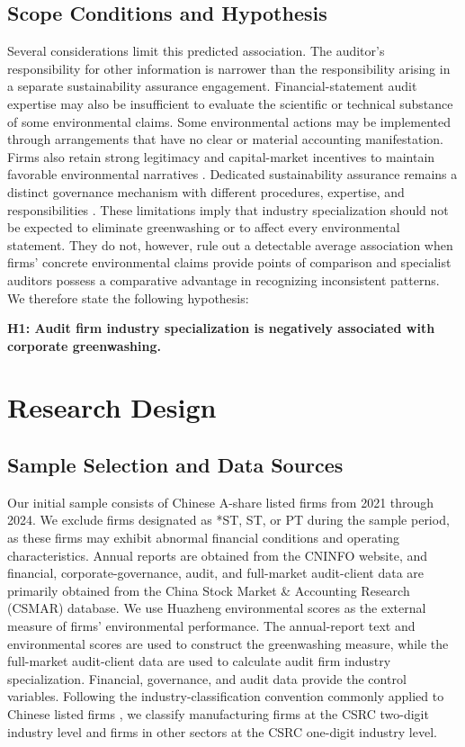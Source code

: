 \documentclass[11pt]{article}
\begin{document}
\subsection{Scope Conditions and Hypothesis}

Several considerations limit this predicted association.
The auditor's responsibility for other information is narrower than the responsibility arising in a separate sustainability assurance engagement.
Financial-statement audit expertise may also be insufficient to evaluate the scientific or technical substance of some environmental claims.
Some environmental actions may be implemented through arrangements that have no clear or material accounting manifestation.
Firms also retain strong legitimacy and capital-market incentives to maintain favorable environmental narratives \citep{delmas2011drivers,healy2001information,verrecchia2001essays}.
Dedicated sustainability assurance remains a distinct governance mechanism with different procedures, expertise, and responsibilities \citep{simnett2009assurance,pflugrath2011impact,cohen2015csr}.
These limitations imply that industry specialization should not be expected to eliminate greenwashing or to affect every environmental statement.
They do not, however, rule out a detectable average association when firms' concrete environmental claims provide points of comparison and specialist auditors possess a comparative advantage in recognizing inconsistent patterns.
We therefore state the following hypothesis:

\medskip
\noindent\textbf{H1: Audit firm industry specialization is negatively associated with corporate greenwashing.}
\medskip

\section{Research Design}

\subsection{Sample Selection and Data Sources}

Our initial sample consists of Chinese A-share listed firms from 2021 through 2024. 
We exclude firms designated as *ST, ST, or PT during the sample period, as these firms may exhibit abnormal financial conditions and operating characteristics.
Annual reports are obtained from the CNINFO website, and financial, corporate-governance, audit, 
and full-market audit-client data are primarily obtained from the China Stock Market \& Accounting Research (CSMAR) database. 
We use Huazheng environmental scores as the external measure of firms' environmental performance. 
The annual-report text and environmental scores are used to construct the greenwashing measure, 
while the full-market audit-client data are used to calculate audit firm industry specialization. 
Financial, governance, and audit data provide the control variables. 
Following the industry-classification convention commonly applied to Chinese listed firms \citep{gul2010ownership}, 
we classify manufacturing firms at the CSRC two-digit industry level and firms in other sectors at the CSRC one-digit industry level.
\end{document}
